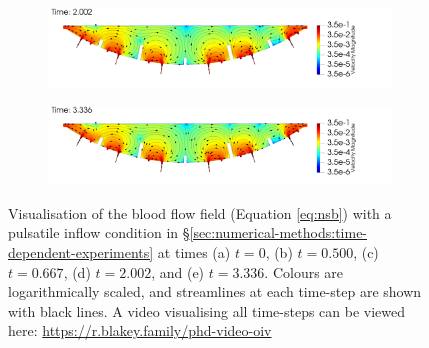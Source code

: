 \begin{figure}
\begin{subfigure}{\textwidth}
                \caption{}
                \label{fig:oscillating-inlet-velocity:3}
            \end{subfigure}
            \begin{subfigure}{\textwidth}
                \includegraphics[width=\textwidth]{diagrams/results-modelling/velocity-transport-oscillating/placenta-velocity/velocity.0060.png}
                \caption{}
                \label{fig:oscillating-inlet-velocity:4}
            \end{subfigure}
            \begin{subfigure}{\textwidth}
                \includegraphics[width=\textwidth]{diagrams/results-modelling/velocity-transport-oscillating/placenta-velocity/velocity.0100.png}
                \caption{}
                \label{fig:oscillating-inlet-velocity:5}
            \end{subfigure}
            \caption{Visualisation of the blood flow field (Equation \eqref{eq:nsb}) with a pulsatile inflow condition in \S\ref{sec:numerical-methods:time-dependent-experiments} at times (a) $t=0$, (b) $t=0.500$, (c) $t=0.667$, (d) $t=2.002$, and (e) $t=3.336$. Colours are logarithmically scaled, and streamlines at each time-step are shown with black lines. A video visualising all time-steps can be viewed here: \url{https://r.blakey.family/phd-video-oiv}}
            \label{fig:oscillating-inlet-velocity}
        \end{figure}

